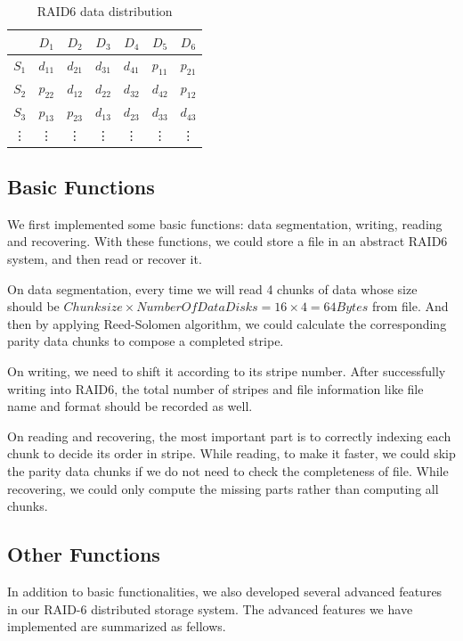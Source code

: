 \documentclass[journal]{IEEEtran}
\begin{document}
\begin{table}[ht]
\centering
\begin{tabular}{c|cccccc}

 		&  $D_1$ 	& $D_2$ 	& $D_3$ 	& $D_4$ 	& $D_5$ 	& $D_6$ 	\\
 		\hline
 $S_1$ 	&  $d_{11}$ & $d_{21}$ 	& $d_{31}$ 	& $d_{41}$ 	& $p_{11}$ 	& $p_{21}$ 	\\
 $S_2$ 	&  $p_{22}$	& $d_{12}$ 	& $d_{22}$ 	& $d_{32}$ 	& $d_{42}$ 	& $p_{12}$ 	 \\
 $S_3$ 	&  $p_{13}$ & $p_{23}$	& $d_{13}$ 	& $d_{23}$ 	& $d_{33}$ 	& $d_{43}$ 	\\
 \vdots &   \vdots & \vdots & \vdots & \vdots & \vdots & \vdots  	
\end{tabular}
\caption{RAID6 data distribution}
\end{table}

\subsection{Basic Functions}

We first implemented some basic functions: data segmentation, writing, reading and recovering. With these functions, we could store a file in an abstract RAID6 system, and then read or recover it.

On data segmentation, every time we will read 4 chunks of data whose size should be $Chunk size \times Number Of Data Disks = 16 \times 4 = 64 Bytes$ from file. And then by applying Reed-Solomen algorithm, we could calculate the corresponding parity data chunks to compose a completed stripe. 

On writing, we need to shift it according to its stripe number. After successfully writing into RAID6, the total number of stripes and file information like file name and format should be recorded as well.

On reading and recovering, the most important part is to correctly indexing each chunk to decide its order in stripe. While reading, to make it faster, we could skip the parity data chunks if we do not need to check the completeness of file. While recovering, we could only compute the missing parts rather than computing all chunks.

\subsection{Other Functions}
In addition to basic functionalities, we also developed several advanced features in our RAID-6 distributed storage system. The advanced features we have implemented are summarized as fellows.
\end{document}
